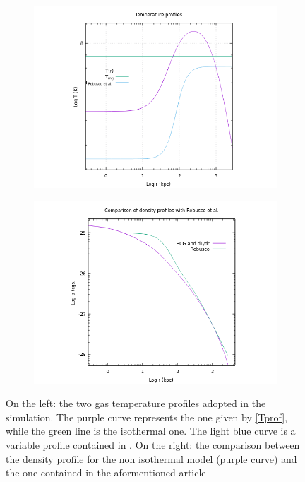 \documentclass{article}
\begin{document}
\begin{figure}[H]
	\begin{subfigure}{0.49\textwidth}
		\includegraphics[width=\textwidth]{temprofiles.png}
	\end{subfigure}
	\begin{subfigure}{0.49\textwidth}
		\includegraphics[width=\textwidth]{rebrho.png}
	\end{subfigure}
	\caption{On the left: the two gas temperature profiles adopted in the simulation. The purple curve represents the one given by \eqref{Tprof}, while the green line is the isothermal one. The light blue curve is a variable profile contained in \cite{rebusco}.
	On the right: the comparison between the density profile for the non isothermal model (purple curve) and the one contained in the aformentioned article }
	\label{fig:tempprof}
\end{figure}
\end{document}
